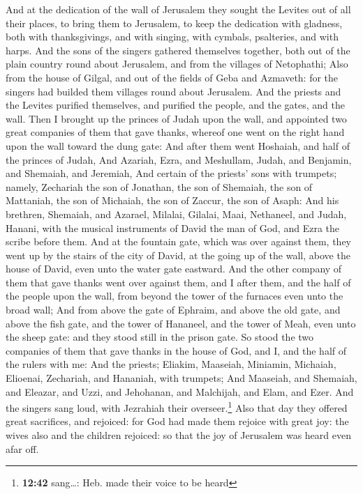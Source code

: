  And at the dedication of the wall of Jerusalem they
sought the Levites out of all their places, to bring them to Jerusalem,
to keep the dedication with gladness, both with thanksgivings, and with
singing, with cymbals, psalteries, and with harps.  And
the sons of the singers gathered themselves together, both out of the
plain country round about Jerusalem, and from the villages of
Netophathi;  Also from the house of Gilgal, and out of
the fields of Geba and Azmaveth: for the singers had builded them
villages round about Jerusalem.  And the priests and the
Levites purified themselves, and purified the people, and the gates, and
the wall.  Then I brought up the princes of Judah upon
the wall, and appointed two great companies of them that gave thanks,
whereof one went on the right hand upon the wall toward the dung gate:
 And after them went Hoshaiah, and half of the princes of
Judah,  And Azariah, Ezra, and Meshullam, 
Judah, and Benjamin, and Shemaiah, and Jeremiah,  And
certain of the priests' sons with trumpets; namely, Zechariah the son of
Jonathan, the son of Shemaiah, the son of Mattaniah, the son of
Michaiah, the son of Zaccur, the son of Asaph:  And his
brethren, Shemaiah, and Azarael, Milalai, Gilalai, Maai, Nethaneel, and
Judah, Hanani, with the musical instruments of David the man of God, and
Ezra the scribe before them.  And at the fountain gate,
which was over against them, they went up by the stairs of the city of
David, at the going up of the wall, above the house of David, even unto
the water gate eastward.  And the other company of them
that gave thanks went over against them, and I after them, and the half
of the people upon the wall, from beyond the tower of the furnaces even
unto the broad wall;  And from above the gate of Ephraim,
and above the old gate, and above the fish gate, and the tower of
Hananeel, and the tower of Meah, even unto the sheep gate: and they
stood still in the prison gate.  So stood the two
companies of them that gave thanks in the house of God, and I, and the
half of the rulers with me:  And the priests; Eliakim,
Maaseiah, Miniamin, Michaiah, Elioenai, Zechariah, and Hananiah, with
trumpets;  And Maaseiah, and Shemaiah, and Eleazar, and
Uzzi, and Jehohanan, and Malchijah, and Elam, and Ezer. And the singers
sang loud, with Jezrahiah their overseer.\footnote{\textbf{12:42}
  sang\ldots: Heb. made their voice to be heard}  Also
that day they offered great sacrifices, and rejoiced: for God had made
them rejoice with great joy: the wives also and the children rejoiced:
so that the joy of Jerusalem was heard even afar off.

